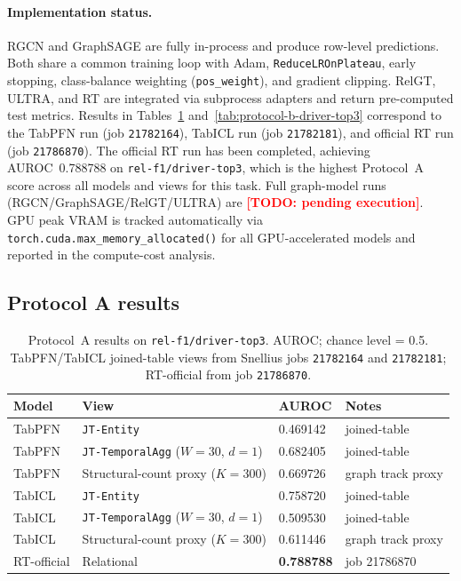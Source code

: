 \documentclass[11pt]{article}
\newcommand{\todo}[1]{\textcolor{red}{\textbf{[TODO: #1]}}}
\newcommand{\viewname}[1]{\texttt{#1}}
\begin{document}
\paragraph{Implementation status.}
RGCN and GraphSAGE are fully in-process and produce row-level predictions.
Both share a common training loop with Adam, \texttt{ReduceLROnPlateau},
early stopping, class-balance weighting (\texttt{pos\_weight}), and
gradient clipping.
RelGT, ULTRA, and RT are integrated via subprocess adapters and return
pre-computed test metrics.
Results in Tables~\ref{tab:protocol-a-driver-top3}
and~\ref{tab:protocol-b-driver-top3} correspond to the
TabPFN run (job \texttt{21782164}), TabICL run (job \texttt{21782181}),
and official RT run (job \texttt{21786870}).
The official RT run has been completed, achieving AUROC~0.788788 on
\texttt{rel-f1/driver-top3}, which is the highest Protocol~A score
across all models and views for this task.
Full graph-model runs (RGCN/GraphSAGE/RelGT/ULTRA) are
\todo{pending execution}.
GPU peak VRAM is tracked automatically via
\texttt{torch.cuda.max\_memory\_allocated()} for all GPU-accelerated
models and reported in the compute-cost analysis.

\subsection{Protocol A results}
\label{sec:protocol_a_results}

\begin{table}[t]
\centering
\caption{Protocol~A results on \texttt{rel-f1/driver-top3}.
         AUROC; chance level = 0.5. TabPFN/TabICL joined-table views
         from Snellius jobs \texttt{21782164} and \texttt{21782181};
         RT-official from job \texttt{21786870}.}
\label{tab:protocol-a-driver-top3}
\begin{tabular}{llll}
\toprule
Model & View & AUROC & Notes \\
\midrule
TabPFN & \viewname{JT-Entity}                      & 0.469142 & joined-table \\
TabPFN & \viewname{JT-TemporalAgg} ($W=30$, $d=1$) & 0.682405 & joined-table \\
TabPFN & Structural-count proxy ($K=300$)          & 0.669726 & graph track proxy \\
TabICL & \viewname{JT-Entity}                      & 0.758720 & joined-table \\
TabICL & \viewname{JT-TemporalAgg} ($W=30$, $d=1$) & 0.509530 & joined-table \\
TabICL & Structural-count proxy ($K=300$)          & 0.611446 & graph track proxy \\
\midrule
RT-official & Relational                           & \textbf{0.788788} & job 21786870 \\
\bottomrule
\end{tabular}
\end{table}
\end{document}
